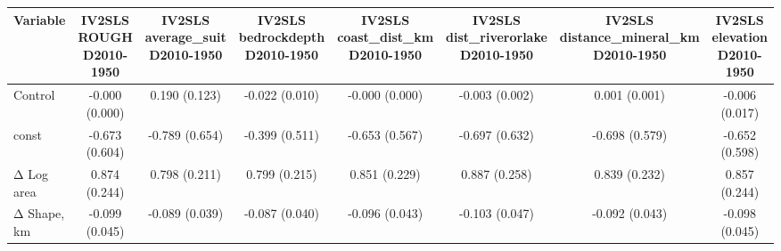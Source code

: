 \begin{tabular}{lccccccc}
\toprule
Variable & IV2SLS ROUGH D2010-1950 & IV2SLS average_suit D2010-1950 & IV2SLS bedrockdepth D2010-1950 & IV2SLS coast_dist_km D2010-1950 & IV2SLS dist_riverorlake D2010-1950 & IV2SLS distance_mineral_km D2010-1950 & IV2SLS elevation D2010-1950 \\
\midrule
Control & -0.000 (0.000) & 0.190 (0.123) & -0.022 (0.010) & -0.000 (0.000) & -0.003 (0.002) & 0.001 (0.001) & -0.006 (0.017) \\
const & -0.673 (0.604) & -0.789 (0.654) & -0.399 (0.511) & -0.653 (0.567) & -0.697 (0.632) & -0.698 (0.579) & -0.652 (0.598) \\
Δ Log area & 0.874 (0.244) & 0.798 (0.211) & 0.799 (0.215) & 0.851 (0.229) & 0.887 (0.258) & 0.839 (0.232) & 0.857 (0.244) \\
Δ Shape, km & -0.099 (0.045) & -0.089 (0.039) & -0.087 (0.040) & -0.096 (0.043) & -0.103 (0.047) & -0.092 (0.043) & -0.098 (0.045) \\
\bottomrule
\end{tabular}
